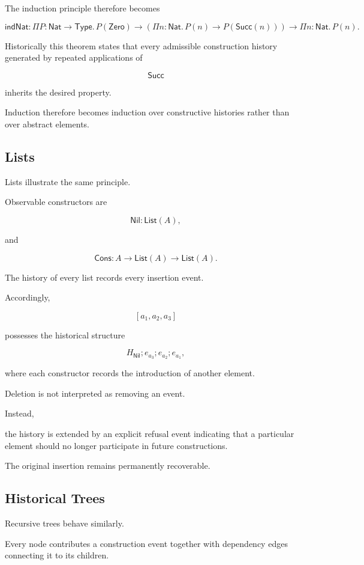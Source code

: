 \documentclass[12pt,oneside]{article}
\theoremstyle{definition}
\theoremstyle{remark}
\newcommand{\Type}{\mathsf{Type}}
\begin{document}
The induction principle therefore becomes

\[
\mathsf{indNat}
:
\Pi
P:\mathsf{Nat}\rightarrow\Type.
\,
P(\mathsf{Zero})
\rightarrow
\left(
\Pi
n:\mathsf{Nat}.
\,
P(n)
\rightarrow
P(\mathsf{Succ}(n))
\right)
\rightarrow
\Pi
n:\mathsf{Nat}.
\,
P(n).
\]

Historically this theorem states that every admissible construction history
generated by repeated applications of

\[
\mathsf{Succ}
\]

inherits the desired property.

Induction therefore becomes induction over constructive histories rather than
over abstract elements.

\subsection{Lists}

Lists illustrate the same principle.

Observable constructors are

\[
\mathsf{Nil}
:
\mathsf{List}(A),
\]

and

\[
\mathsf{Cons}
:
A
\rightarrow
\mathsf{List}(A)
\rightarrow
\mathsf{List}(A).
\]

The history of every list records every insertion event.

Accordingly,

\[
[a_1,a_2,a_3]
\]

possesses the historical structure

\[
H_{\mathsf{Nil}};
e_{a_3};
e_{a_2};
e_{a_1},
\]

where each constructor records the introduction of another element.

Deletion is not interpreted as removing an event.

Instead,

the history is extended by an explicit refusal event indicating that a
particular element should no longer participate in future constructions.

The original insertion remains permanently recoverable.

\subsection{Historical Trees}

Recursive trees behave similarly.

Every node contributes a construction event together with dependency edges
connecting it to its children.
\end{document}
